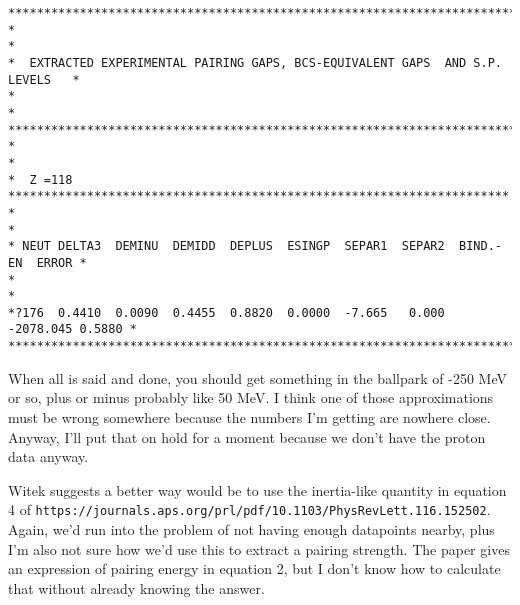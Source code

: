 \documentclass[]{report}
\begin{document}
\begin{verbatim}
********************************************************************************
*                                                                              *
*  EXTRACTED EXPERIMENTAL PAIRING GAPS, BCS-EQUIVALENT GAPS  AND S.P. LEVELS   *
*                                                                              *
********************************************************************************
*                                                                              *
*  Z =118 **********************************************************************
*                                                                              *
* NEUT DELTA3  DEMINU  DEMIDD  DEPLUS  ESINGP  SEPAR1  SEPAR2  BIND.-EN  ERROR *
*                                                                              *
*?176  0.4410  0.0090  0.4455  0.8820  0.0000  -7.665   0.000 -2078.045 0.5880 *
********************************************************************************
\end{verbatim}

\noindent When all is said and done, you should get something in the ballpark of -250 MeV or so, plus or minus probably like 50 MeV. I think one of those approximations must be wrong somewhere because the numbers I'm getting are nowhere close. Anyway, I'll put that on hold for a moment because we don't have the proton data anyway.

Witek suggests a better way would be to use the inertia-like quantity in equation 4 of \verb|https://journals.aps.org/prl/pdf/10.1103/PhysRevLett.116.152502|. Again, we'd run into the problem of not having enough datapoints nearby, plus I'm also not sure how we'd use this to extract a pairing strength. The paper gives an expression of pairing energy in equation 2, but I don't know how to calculate that without already knowing the answer.
\end{document}
